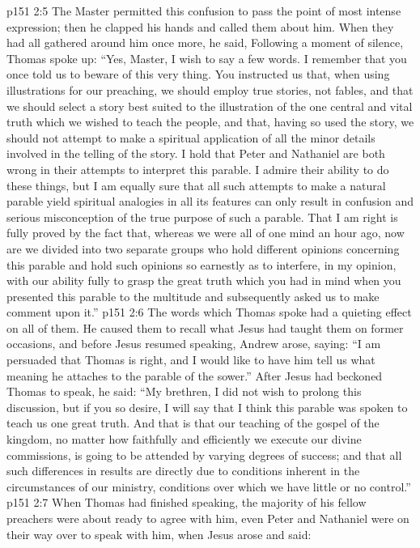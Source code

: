 \vs p151 2:5 The Master permitted this confusion to pass the point of most intense expression; then he clapped his hands and called them about him. When they had all gathered around him once more, he said,  Following a moment of silence, Thomas spoke up: “Yes, Master, I wish to say a few words. I remember that you once told us to beware of this very thing. You instructed us that, when using illustrations for our preaching, we should employ true stories, not fables, and that we should select a story best suited to the illustration of the one central and vital truth which we wished to teach the people, and that, having so used the story, we should not attempt to make a spiritual application of all the minor details involved in the telling of the story. I hold that Peter and Nathaniel are both wrong in their attempts to interpret this parable. I admire their ability to do these things, but I am equally sure that all such attempts to make a natural parable yield spiritual analogies in all its features can only result in confusion and serious misconception of the true purpose of such a parable. That I am right is fully proved by the fact that, whereas we were all of one mind an hour ago, now are we divided into two separate groups who hold different opinions concerning this parable and hold such opinions so earnestly as to interfere, in my opinion, with our ability fully to grasp the great truth which you had in mind when you presented this parable to the multitude and subsequently asked us to make comment upon it.”
\vs p151 2:6 The words which Thomas spoke had a quieting effect on all of them. He caused them to recall what Jesus had taught them on former occasions, and before Jesus resumed speaking, Andrew arose, saying: “I am persuaded that Thomas is right, and I would like to have him tell us what meaning he attaches to the parable of the sower.” After Jesus had beckoned Thomas to speak, he said: “My brethren, I did not wish to prolong this discussion, but if you so desire, I will say that I think this parable was spoken to teach us one great truth. And that is that our teaching of the gospel of the kingdom, no matter how faithfully and efficiently we execute our divine commissions, is going to be attended by varying degrees of success; and that all such differences in results are directly due to conditions inherent in the circumstances of our ministry, conditions over which we have little or no control.”
\vs p151 2:7 When Thomas had finished speaking, the majority of his fellow preachers were about ready to agree with him, even Peter and Nathaniel were on their way over to speak with him, when Jesus arose and said: 
